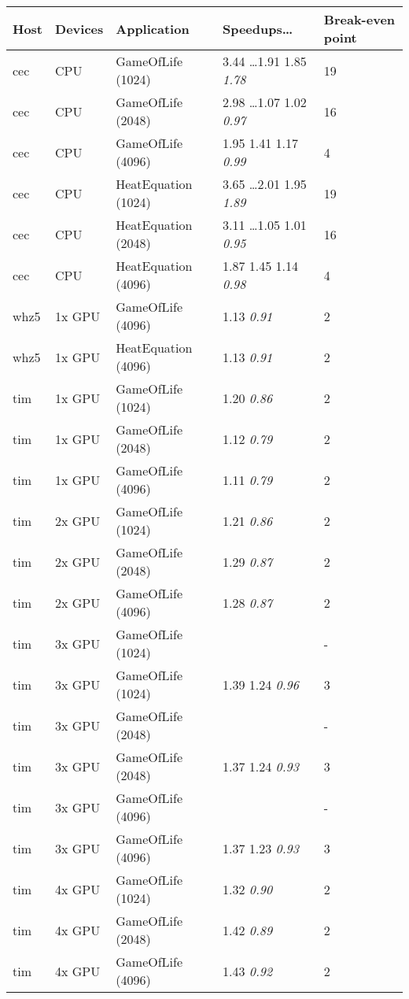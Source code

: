 \begin{table}
\footnotesize
\centering
\begin{tabular}{| l | l | l | l | l |}
\hline
\textbf{Host} & \textbf{Devices} & \textbf{Application} & \textbf{Speedups\ldots} & \textbf{Break-even point}\\
\hline
cec & CPU & GameOfLife (1024) & 3.44 \ldots 1.91 1.85 \textit{1.78} & 19 \\
cec & CPU & GameOfLife (2048) & 2.98 \ldots 1.07 1.02 \textit{0.97} & 16 \\
cec & CPU & GameOfLife (4096) & 1.95 1.41 1.17 \textit{0.99} & 4 \\
cec & CPU & HeatEquation (1024) & 3.65 \ldots 2.01 1.95 \textit{1.89} & 19 \\
cec & CPU & HeatEquation (2048) & 3.11 \ldots 1.05 1.01 \textit{0.95} & 16 \\
cec & CPU & HeatEquation (4096) & 1.87 1.45 1.14 \textit{0.98} & 4 \\
whz5 & 1x GPU & GameOfLife (4096) & 1.13 \textit{0.91} & 2 \\
whz5 & 1x GPU & HeatEquation (4096) & 1.13 \textit{0.91} & 2 \\
tim & 1x GPU & GameOfLife (1024) & 1.20 \textit{0.86} & 2 \\
tim & 1x GPU & GameOfLife (2048) & 1.12 \textit{0.79} & 2 \\
tim & 1x GPU & GameOfLife (4096) & 1.11 \textit{0.79} & 2 \\
tim & 2x GPU & GameOfLife (1024) & 1.21 \textit{0.86} & 2 \\
tim & 2x GPU & GameOfLife (2048) & 1.29 \textit{0.87} & 2 \\
tim & 2x GPU & GameOfLife (4096) & 1.28 \textit{0.87} & 2 \\
tim & 3x GPU & GameOfLife (1024) &  & - \\
tim & 3x GPU & GameOfLife (1024) & 1.39 1.24 \textit{0.96} & 3 \\
tim & 3x GPU & GameOfLife (2048) &  & - \\
tim & 3x GPU & GameOfLife (2048) & 1.37 1.24 \textit{0.93} & 3 \\
tim & 3x GPU & GameOfLife (4096) &  & - \\
tim & 3x GPU & GameOfLife (4096) & 1.37 1.23 \textit{0.93} & 3 \\
tim & 4x GPU & GameOfLife (1024) & 1.32 \textit{0.90} & 2 \\
tim & 4x GPU & GameOfLife (2048) & 1.42 \textit{0.89} & 2 \\
tim & 4x GPU & GameOfLife (4096) & 1.43 \textit{0.92} & 2 \\

\end{tabular}
\end{table}
